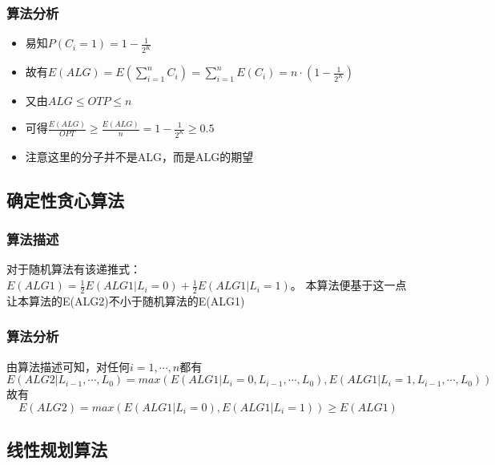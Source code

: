\subsubsection{算法分析}
\begin{itemize}
	\item 易知$P(C_i=1)=1-\frac{1}{2^K} $
	\item 故有$E(ALG)=E(\sum_{i=1}^n C_i)=\sum_{i=1}^n E(C_i)=n\cdot (1-\frac{1}{2^K})$
	\item 又由$ALG\leqslant OTP\leqslant n$
	\item 可得$\frac{E(ALG)}{OPT}\geqslant \frac{E(ALG)}{n}=1-\frac{1}{2^K}\geqslant 0.5$
	\item 注意这里的分子并不是ALG，而是ALG的期望
\end{itemize}

\subsection{确定性贪心算法}

\subsubsection{算法描述}

对于随机算法有该递推式：$E(ALG1)=\frac{1}{2}E(ALG1|L_i=0)+\frac{1}{2}E(ALG1|L_i=1)$。
本算法便基于这一点让本算法的E(ALG2)不小于随机算法的E(ALG1)

\begin{algorithm}
\end{algorithm}

\subsubsection{算法分析}
由算法描述可知，对任何$i=1,\cdots,n$都有
\begin{displaymath}
	E(ALG2|L_{i-1},\cdots,L_0)=max(E(ALG1|L_i=0,L_{i-1},\cdots,L_0),E(ALG1|L_i=1,L_{i-1},\cdots,L_0))	
\end{displaymath}
故有
\begin{displaymath}
E(ALG2)=max(E(ALG1|L_i=0),E(ALG1|L_i=1))\geqslant E(ALG1)
\end{displaymath}

\subsection{线性规划算法}

